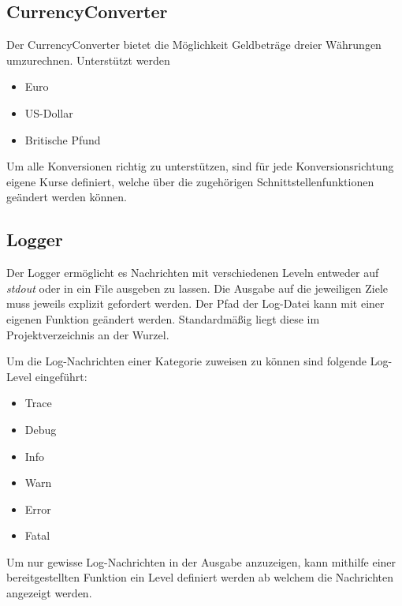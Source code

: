 \subsection{CurrencyConverter}
Der CurrencyConverter bietet die Möglichkeit Geldbeträge dreier Währungen umzurechnen. Unterstützt werden 
\begin{itemize}
	\item Euro
	\item US-Dollar
	\item Britische Pfund
\end{itemize}

Um alle Konversionen richtig zu unterstützen, sind für jede Konversionsrichtung eigene Kurse definiert, welche über die zugehörigen Schnittstellenfunktionen geändert werden können.

\subsection{Logger}
Der Logger ermöglicht es Nachrichten mit verschiedenen Leveln entweder auf \textit{stdout} oder in ein File ausgeben zu lassen. Die Ausgabe auf die jeweiligen Ziele muss jeweils explizit gefordert werden. Der Pfad der Log-Datei kann mit einer eigenen Funktion geändert werden. Standardmäßig liegt diese im Projektverzeichnis an der Wurzel.

Um die Log-Nachrichten einer Kategorie zuweisen zu können sind folgende Log-Level eingeführt:

\begin{itemize}
	\item Trace
	\item Debug
	\item Info
	\item Warn
	\item Error
	\item Fatal
\end{itemize}

Um nur gewisse Log-Nachrichten in der Ausgabe anzuzeigen, kann mithilfe einer bereitgestellten Funktion ein Level definiert werden ab welchem die Nachrichten angezeigt werden.